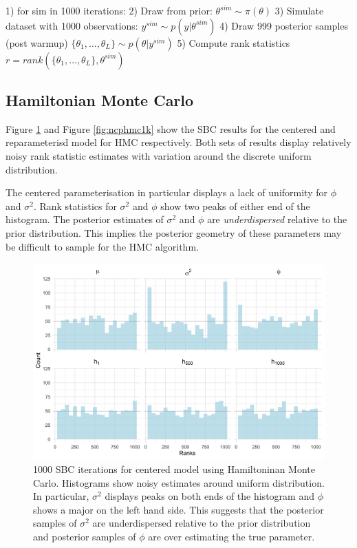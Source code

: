 \documentclass[12pt, a4paper]{article}
\begin{document}
    1) for sim in 1000 iterations:
        2) Draw from prior: $\theta^{sim}\sim\pi (\theta)$
        3) Simulate dataset with 1000 observations: $y^{sim} \sim p(y|\theta^{sim})$
        4) Draw 999 posterior samples (post warmup) $\{\theta_1,\dots , \theta_{L}\} \sim p(\theta | y^{sim})$
        5) Compute rank statistics $r = rank(\{\theta_1,\dots , \theta_{L}\}, \theta^{sim})$
        
    \subsection{Hamiltonian Monte Carlo}
    Figure \ref{fig:cphmc1k} and Figure \ref{fig:ncphmc1k} show the SBC results for the centered and reparameterisd model for HMC respectively. Both sets of results display relatively noisy rank statistic estimates with variation around the discrete uniform distribution.

    The centered parameterisation in particular displays a lack of uniformity for $\phi$ and $\sigma^2$. Rank statistics for $\sigma^2$ and $\phi$ show two peaks of either end of the histogram. The posterior estimates of $\sigma^2$ and $\phi$ are \textit{underdispersed} relative to the prior distribution. This implies the posterior geometry of these parameters may be difficult to sample for the HMC algorithm.

    \begin{figure}[H]
        \centering
        \includegraphics[scale=0.09]{results/hmc_cp_1k.png}
        \caption{1000 SBC iterations for centered model using Hamiltoninan Monte Carlo. Histograms show noisy estimates around uniform distribution. In particular, $\sigma^2$ displays peaks on both ends of the histogram and $\phi$ shows a major on the left hand side. This suggests that the posterior samples of $\sigma^2$ are underdispersed relative to the prior distribution and posterior samples of $\phi$ are over estimating the true parameter.}
        \label{fig:cphmc1k}
    \end{figure} 
\end{document}
